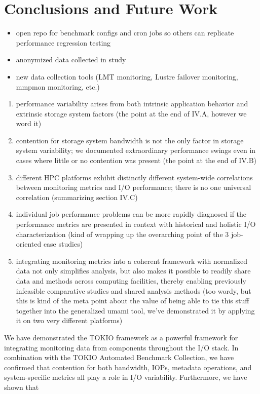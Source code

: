 \section{Conclusions and Future Work} \label{sec:conclusions}

\begin{itemize}
\item open repo for benchmark configs and cron jobs so others can replicate
performance regression testing
\item anonymized data collected in study
\item new data collection tools (LMT monitoring, Lustre failover monitoring,
mmpmon monitoring, etc.)
\end{itemize}

\begin{enumerate}
\item performance variability arises from both intrinsic application behavior and extrinsic storage system factors (the point at the end of IV.A, however we word it)
\item contention for storage system bandwidth is not the only factor in storage system variability; we documented extraordinary performance swings even in cases where little or no contention was present (the point at the end of IV.B)
\item different HPC platforms exhibit distinctly different system-wide correlations between monitoring metrics and I/O performance; there is no one universal correlation (summarizing section IV.C)
\item individual job performance problems can be more rapidly diagnosed if the performance metrics are presented in context with historical and holistic I/O characterization (kind of wrapping up the overarching point of the 3 job-oriented case studies)
\item integrating monitoring metrics into a coherent framework with normalized data not only simplifies analysis, but also makes it possible to readily share data and methods across computing facilities, thereby enabling previously infeasible comparative studies and shared analysis methods (too wordy, but this is kind of the meta point about the value of being able to tie this  stuff together into the generalized umami tool, we've demonstrated it by applying it on two very different platforms)
\end{enumerate}

 We have demonstrated the TOKIO framework as a powerful framework for integrating monitoring data from components throughout the I/O stack.  In combination with the TOKIO Automated Benchmark Collection, we have confirmed that contention for both bandwidth, IOPs, metadata operations, and system-specific metrics all play a role in I/O variability.  Furthermore, we have shown that 



